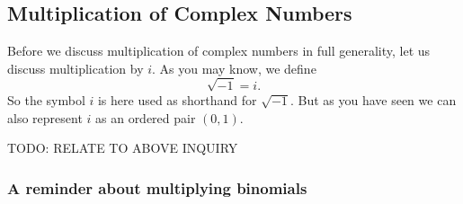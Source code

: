 \documentclass[11pt]{article}
\theoremstyle{definition}
\begin{document}
\subsection{Multiplication of Complex Numbers}

Before we discuss multiplication of complex numbers in full generality, let us discuss multiplication by $i$. As you may know, we define
\[ \sqrt{-1} = i. \]
So the symbol $i$ is here used as shorthand for $\sqrt{-1}$. But as you have seen we can also represent $i$ as an ordered pair $(0,1)$.

TODO: RELATE TO ABOVE INQUIRY

\subsubsection{A reminder about multiplying binomials}
\end{document}
